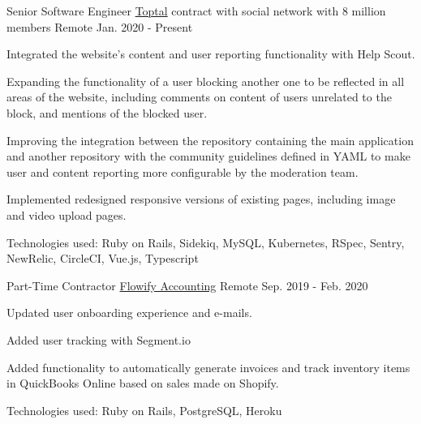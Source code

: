 \documentclass[11pt, a4paper]{awesome-cv}
\begin{document}
\begin{cventries}

  \cventry
    {Senior Software Engineer} %
    {\href{https://www.toptal.com/}{Toptal} contract with social network with 8 million members} %
    {Remote} %
    {Jan. 2020 - Present}
    {
      \begin{cvitems} %
        \item {Integrated the website's content and user reporting functionality with Help Scout.}
        \item {Expanding the functionality of a user blocking another one to be reflected in all areas of the website, including comments on content of users unrelated to the block, and mentions of the blocked user.}
        \item {Improving the integration between the repository containing the main application and another repository with the community guidelines defined in YAML to make user and content reporting more configurable by the moderation team.}
        \item {Implemented redesigned responsive versions of existing pages, including image and video upload pages.}
        \item {Technologies used: Ruby on Rails, Sidekiq, MySQL, Kubernetes, RSpec, Sentry, NewRelic, CircleCI, Vue.js, Typescript}
      \end{cvitems}
    }

  \cventry
    {Part-Time Contractor} %
    {\href{https://flowifyaccounting.com/}{Flowify Accounting}} %
    {Remote} %
    {Sep. 2019 - Feb. 2020} %
    {
      \begin{cvitems} %
        \item {Updated user onboarding experience and e-mails.}
        \item {Added user tracking with Segment.io}
        \item {Added functionality to automatically generate invoices and track inventory items in QuickBooks Online based on sales made on Shopify.}
        \item {Technologies used: Ruby on Rails, PostgreSQL, Heroku}
      \end{cvitems}
    }


\end{cventries}
\end{document}
